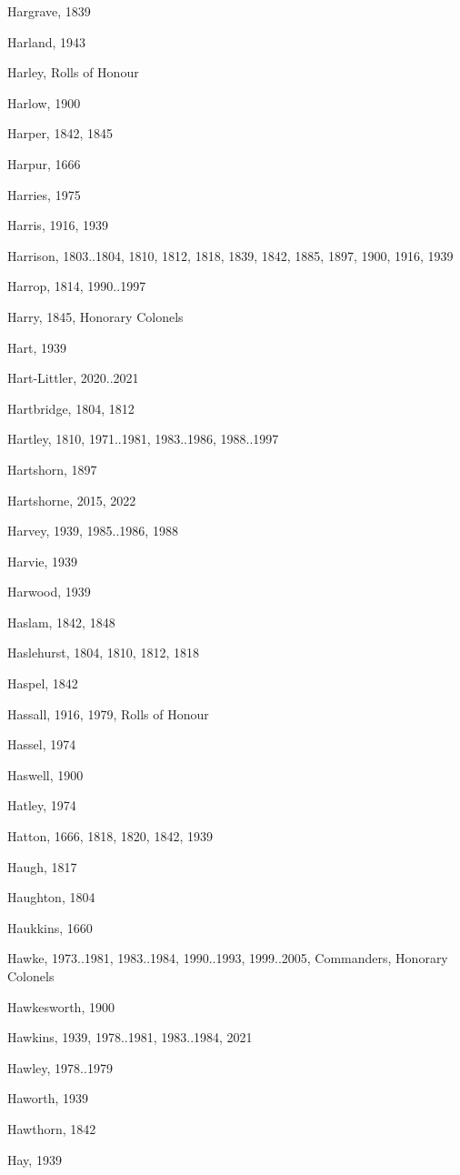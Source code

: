 \begin{theindex}
\item Hargrave, 1839
\item Harland, 1943
\item Harley, Rolls of Honour
\item Harlow, 1900
\item Harper, 1842, 1845
\item Harpur, 1666
\item Harries, 1975
\item Harris, 1916, 1939
\item Harrison, 1803..1804, 1810, 1812, 1818, 1839, 1842, 1885, 1897, 1900, 1916, 1939
\item Harrop, 1814, 1990..1997
\item Harry, 1845, Honorary Colonels
\item Hart, 1939
\item Hart-Littler, 2020..2021
\item Hartbridge, 1804, 1812
\item Hartley, 1810, 1971..1981, 1983..1986, 1988..1997
\item Hartshorn, 1897
\item Hartshorne, 2015, 2022
\item Harvey, 1939, 1985..1986, 1988
\item Harvie, 1939
\item Harwood, 1939
\item Haslam, 1842, 1848
\item Haslehurst, 1804, 1810, 1812, 1818
\item Haspel, 1842
\item Hassall, 1916, 1979, Rolls of Honour
\item Hassel, 1974
\item Haswell, 1900
\item Hatley, 1974
\item Hatton, 1666, 1818, 1820, 1842, 1939
\item Haugh, 1817
\item Haughton, 1804
\item Haukkins, 1660
\item Hawke, 1973..1981, 1983..1984, 1990..1993, 1999..2005, Commanders, Honorary Colonels
\item Hawkesworth, 1900
\item Hawkins, 1939, 1978..1981, 1983..1984, 2021
\item Hawley, 1978..1979
\item Haworth, 1939
\item Hawthorn, 1842
\item Hay, 1939

\end{theindex}
